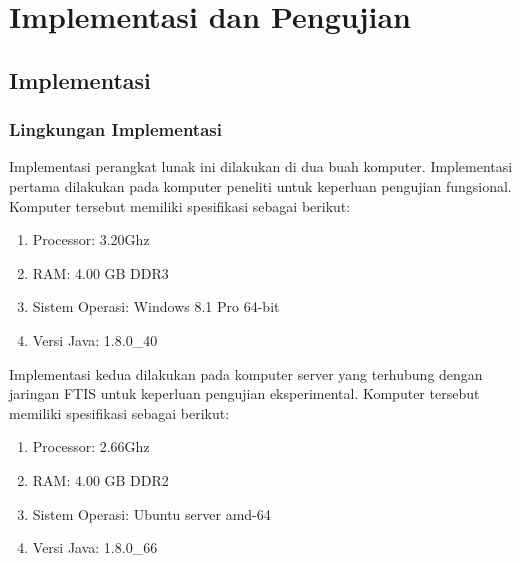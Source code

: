 \chapter{Implementasi dan Pengujian}
\label{chap:implementasiPengujian}

\section{Implementasi}
\label{sec:implementasi}

\subsection{Lingkungan Implementasi}
		\label{sec:lingkungan_implementasi}
			Implementasi perangkat lunak ini dilakukan di dua buah komputer. Implementasi pertama dilakukan pada komputer peneliti untuk keperluan pengujian fungsional. Komputer tersebut memiliki spesifikasi sebagai berikut:
				\begin{enumerate}
					\item Processor: 3.20Ghz 
					\item RAM: 4.00 GB DDR3	
					\item Sistem Operasi: Windows 8.1 Pro 64-bit 
					\item Versi Java: 1.8.0\_40
				\end{enumerate}
				Implementasi kedua dilakukan pada komputer server yang terhubung dengan jaringan FTIS untuk keperluan pengujian eksperimental. Komputer tersebut memiliki spesifikasi sebagai berikut:
				\begin{enumerate}
					\item Processor: 2.66Ghz 
					\item RAM: 4.00 GB DDR2	
					\item Sistem Operasi: Ubuntu server amd-64 
					\item Versi Java: 1.8.0\_66
				\end{enumerate}

